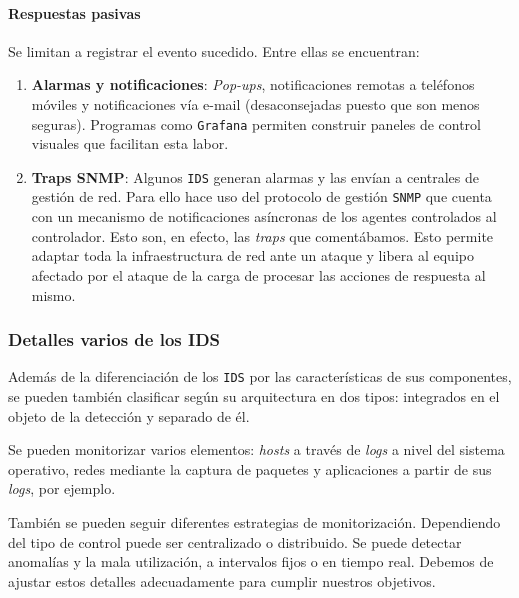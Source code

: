 \documentclass[12pt]{article}
\newcommand{\newpar} {
    \vskip 0.5cm
}
\begin{document}
                \paragraph{Respuestas pasivas}
                    Se limitan a registrar el evento sucedido. Entre ellas se encuentran:

                    \begin{enumerate}
                        \item \textbf{Alarmas y notificaciones}: \textit{Pop-ups}, notificaciones remotas a teléfonos móviles y notificaciones vía e-mail (desaconsejadas puesto que son menos seguras). Programas como \texttt{Grafana} permiten construir paneles de control visuales que facilitan esta labor.
                        \item \textbf{Traps SNMP}: Algunos \texttt{IDS} generan alarmas y las envían a centrales de gestión de red. Para ello hace uso del protocolo de gestión \texttt{SNMP} que cuenta con un mecanismo de notificaciones asíncronas de los agentes controlados al controlador. Esto son, en efecto, las \textit{traps} que comentábamos. Esto permite adaptar toda la infraestructura de red ante un ataque y libera al equipo afectado por el ataque de la carga de procesar las acciones de respuesta al mismo.
                    \end{enumerate}

            \subsubsection{Detalles varios de los IDS}
                Además de la diferenciación de los \texttt{IDS} por las características de sus componentes, se pueden también clasificar según su arquitectura en dos tipos: integrados en el objeto de la detección y separado de él.

                \newpar

                Se pueden monitorizar varios elementos: \textit{hosts} a través de \textit{logs} a nivel del sistema operativo, redes mediante la captura de paquetes y aplicaciones a partir de sus \textit{logs}, por ejemplo.

                \newpar

                También se pueden seguir diferentes estrategias de monitorización. Dependiendo del tipo de control puede ser centralizado o distribuido. Se puede detectar anomalías y la mala utilización, a intervalos fijos o en tiempo real. Debemos de ajustar estos detalles adecuadamente para cumplir nuestros objetivos.
\end{document}
